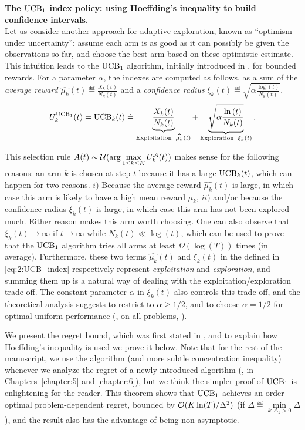 \textbf{The $\mathrm{UCB}_1$ index policy: using Hoeffding's inequality to build confidence intervals.}\\
%
Let us consider another approach for adaptive exploration, known as ``optimism under uncertainty'': assume each arm is as good as it can possibly be given the observations so far, and choose the best arm based on these optimistic estimate.
%
This intuition leads to the $\mathrm{UCB}_1$ algorithm, initially introduced in \cite{Auer02}, for bounded rewards.
For a parameter $\alpha$, the \UCB{} indexes are computed as follows, as a sum of
the \emph{average reward} $\widehat{\mu_k}(t) \eqdef \frac{X_k(t)}{N_k(t)}$
and a \emph{confidence radius} $\xi_k(t) \eqdef \sqrt{\alpha \frac{\log\left(t\right)}{N_k(t)}}$.
%
\begin{align}\label{eq:2:UCB_index}
    U_k^{\mathrm{UCB}_1}(t) = \mathrm{UCB}_k(t) \overset{.}{=} \underbrace{\frac{X_k(t)}{N_k(t)}}_{\text{Exploitation }\; \widehat{\mu_k}(t)} + \underbrace{\sqrt{\alpha \frac{\ln\left(t\right)}{N_k(t)}}}_{\text{Exploration }\; \xi_k(t)}.
\end{align}

This selection rule $A(t) \sim \mathcal{U}(\arg\max\limits_{1\leq k \leq K} U_k^{\mathcal{A}}(t))$ makes sense for the following reasons:
an arm $k$ is chosen at step $t$ because it has a large $\mathrm{UCB}_k(t)$, which can happen for two reasons.
$i)$ Because the average reward $\widehat{\mu_k}(t)$ is large, in which case this arm is likely to have a high mean reward $\mu_k$,
$ii)$ and/or because the confidence radius $\xi_k(t)$ is large, in which case this arm has not been explored much.
Either reason makes this arm worth choosing.
One can also observe that $\xi_k(t)\to\infty$ if $t\to\infty$ while $N_k(t)\ll\log(t)$, which can be used to prove that the $\mathrm{UCB}_1$ algorithm tries all arms at least $\Omega(\log(T))$ times (in average).
%
Furthermore, these two terms $\widehat{\mu_k}(t)$ and $\xi_k(t)$ in the \UCB{} defined in \eqref{eq:2:UCB_index} respectively represent \emph{exploitation} and \emph{exploration}, and summing them up is a natural way of dealing with the exploitation/exploration trade off.
The constant parameter $\alpha$ in $\xi_k(t)$ also controls this trade-off, and the theoretical analysis suggests to restrict to $\alpha\geq1/2$, and to choose $\alpha=1/2$ for optimal uniform performance (\ie, on all problems, \cite{Auer02}).

We present the regret bound, which was first stated in \cite{Auer02}, and to explain how Hoeffding's inequality is used we prove it below.
Note that for the rest of the manuscript, we use the \klUCB{} algorithm (and more subtle concentration inequality) whenever we analyze the regret of a newly introduced algorithm (\ie, in Chapters~\ref{chapter:5} and \ref{chapter:6}),
but we think the simpler proof of $\mathrm{UCB}_1$ is enlightening for the reader.
%
This theorem shows that $\mathrm{UCB}_1$ achieves an order-optimal problem-dependent regret, bounded by $\mathcal{O}(K\ln(T)/\Delta^2)$ (if $\Delta \eqdef \min\limits_{k: \Delta_k>0} \Delta$), and the result also has the advantage of being non asymptotic.

